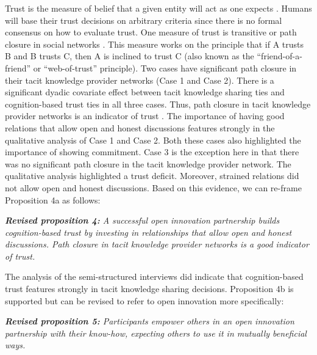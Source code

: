 Trust is the measure of belief that a given entity will act as one expects \citep{richters2011trust}. Humans will base their trust decisions on arbitrary criteria since there is no formal consensus on how to evaluate trust. One measure of trust is transitive or path closure in social networks \citep{coleman1988social,burt2001structural}. This measure works on the principle that if A trusts B and B trusts C, then A is inclined to trust C (also known as the \enquote{friend-of-a-friend} or \enquote{web-of-trust} principle). Two cases have significant path closure in their tacit knowledge provider networks (Case 1 and Case 2). There is a significant dyadic covariate effect between tacit knowledge sharing ties and cognition-based trust ties in all three cases. Thus, path closure in tacit knowledge provider networks is an indicator of trust \citep{sherchan2013survey}. The importance of having good relations that allow open and honest discussions features strongly in the qualitative analysis of Case 1 and Case 2. Both these cases also highlighted the importance of showing commitment. Case 3 is the exception here in that there was no significant path closure in the tacit knowledge provider network. The qualitative analysis highlighted a trust deficit. Moreover, strained relations did not allow open and honest discussions. Based on this evidence, we can re-frame Proposition 4a as follows: \bigskip

\begin{tcolorbox}
\textit{\textbf{Revised proposition 4:} A successful open innovation partnership builds cognition-based trust by investing in relationships that allow open and honest discussions. Path closure in tacit knowledge provider networks is a good indicator of trust.}
\end{tcolorbox}

The analysis of the semi-structured interviews did indicate that cognition-based trust features strongly in tacit knowledge sharing decisions. Proposition 4b is supported but can be revised to refer to open innovation more specifically: \bigskip

\begin{tcolorbox}
\textit{\textbf{Revised proposition 5:} Participants empower others in an open innovation partnership with their know-how, expecting others to use it in mutually beneficial ways.}
\end{tcolorbox}


